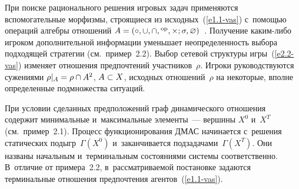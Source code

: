 \begin{multicols}{2}
    При поиске рационального решения игровых задач применяются 
вспомогательные морфизмы, стро\-ящи\-еся из исходных~(\ref{e1.1-vas}) с~по\-мощью 
операций алгебры отношений $A\hm= \left( \circ, \cup, \cap, {}^{\mathrm{op}}, \times; 
\sigma,\varnothing \right)$~\cite{5-vas, 10-vas, 11-vas}. Получение ка\-ким-ли\-бо 
игроком дополнительной информации уменьшает неопределенность выбора 
подходящей стратегии (см.\ пример~2.2). Выбор сетевой структуры  
игры~(\ref{e2.2-vas}) изменяет отношения предпочтений участников~$\rho$. Игроки 
руководствуются сужениями $\rho\vert_A\hm= \rho \cap A^2$, $A\hm\subset X$, 
исходных отношений~$\rho$ на некоторые, вполне определенные подмножества 
ситуаций. 
    
    При условии сделанных предположений граф динамического отношения 
содержит минимальные и~максимальные элементы~--- вершины $X^0$ и~$X^T$ 
(см.~пример~2.1). Процесс функционирования ДМАС начинается с~решения 
статических \mbox{подыгр}~$\Gamma(X^0)$ и~заканчивается подзадачами~$\Gamma(X^T)$. 
Они названы начальным и~терминальным со\-сто\-яни\-ями сис\-те\-мы соответственно. 
В~отличие от примера~2.2, в~рас\-смат\-ри\-ва\-емой по\-ста\-нов\-ке задаются терминальные 
отношения предпочтения агентов~(\ref{e1.1-vas}).

     \begin{figure*}[b] %
\vspace*{1pt}
\begin{minipage}[t]{79mm}
\begin{center}  
    \mbox{%
\epsfxsize=17.323mm 
}
\end{center}
\end{minipage}
\hfill
\vspace*{1pt}
\begin{minipage}[t]{79mm}
\begin{center}
     \mbox{%
\epsfxsize=25.462mm 
}
\end{center}
\end{minipage}
\begin{minipage}[t]{79mm}
\vspace*{-12pt}
\end{minipage}
\hfill
      \begin{minipage}[t]{79mm}
      \vspace*{-12pt}
     \label{f3.2-vas}
     \end{minipage}
     \end{figure*} 


\end{multicols}
